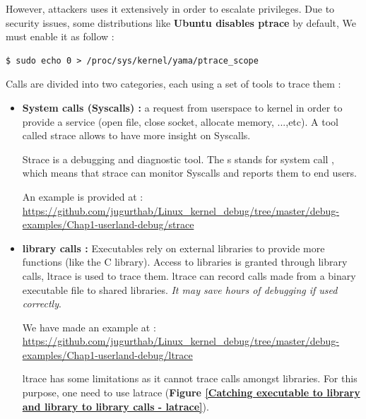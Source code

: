 However, attackers uses it extensively in order to escalate privileges.
Due to security issues, some distributions like \textbf{\color{red}Ubuntu disables ptrace} by default, We must enable it as follow :

\begin{lstlisting}[style=BashInputStyle]
$ sudo echo 0 > /proc/sys/kernel/yama/ptrace_scope
\end{lstlisting}
\vspace{5px}

Calls are divided into two categories, each using a set of tools to trace them :
\begin{itemize}

	\item \textbf{System calls (Syscalls) : } a request from userspace to kernel in order to provide a service (open file, close socket, allocate memory, ...,etc). A tool called strace allows to have more insight on Syscalls.
	
Strace is a debugging and diagnostic tool. The \og s \fg stands for \og system call \fg, which means that strace can monitor
Syscalls and reports them to end users.

An example is provided at : {\color{blue}\url{https://github.com/jugurthab/Linux_kernel_debug/tree/master/debug-examples/Chap1-userland-debug/strace}}

	\item \textbf{library calls : } Executables rely on external libraries to provide more functions (like the C library). Access to libraries is granted through library calls, ltrace is used to trace them. 
\og ltrace \fg can record calls made from a binary executable file to shared libraries. \emph{It may save hours of debugging if used correctly}.
	
We have made an example at : {\color{blue}\url{https://github.com/jugurthab/Linux_kernel_debug/tree/master/debug-examples/Chap1-userland-debug/ltrace}}

\vspace{5px}
    
    
\begin{center}
\begin{mdframed}[
        linecolor=red,linewidth=2pt,%
        frametitlerule=true,%
        apptotikzsetting={\tikzset{mdfframetitlebackground/.append style={%
            shade,left color=white, right color=blue!20}}}, 
        frametitlerulecolor=blue,
        frametitlerulewidth=1pt, innertopmargin=\topskip,
        frametitle={About report},
        outerlinewidth=1.25pt
    ]
			ltrace has some limitations as it cannot trace calls amongst libraries. For this purpose, one need to use latrace (\textbf{Figure \ref{Catching executable to library and library to library calls - latrace}}).
			

\end{mdframed}
\end{center}
\end{itemize}
